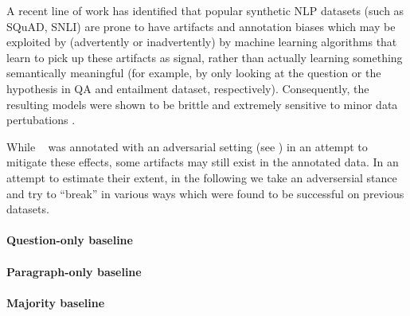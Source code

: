 

A recent line of work has identified that popular synthetic NLP datasets
(such as SQuAD, SNLI) are prone to have artifacts and annotation biases which may be exploited by (advertently or inadvertently) by machine learning algorithms that
learn to pick up these artifacts as signal,
rather than actually learning something semantically meaningful (for example, by
only looking at the question or the hypothesis in QA and entailment dataset, respectively).
Consequently, the resulting models were shown to be brittle and extremely sensitive
to minor data pertubations \cite{max,others}.

While \drop~ was annotated with an adversarial setting
(see ) in an attempt to mitigate these effects, some
artifacts may still exist in the annotated data.
In an attempt to estimate their extent, in the following we take an adversersial
stance and try to ``break'' \drop in various ways which were found to be successful
on previous datasets.

\paragraph{Question-only baseline}

\paragraph{Paragraph-only baseline}

\paragraph{Majority baseline}
